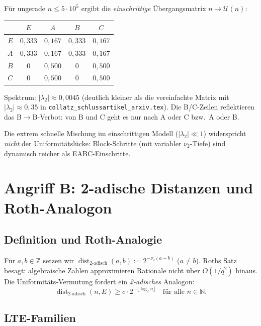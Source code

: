 \documentclass[12pt,a4paper]{article}
\newcommand{\vii}{\nu_2}
\newcommand{\N}{\mathbb{N}}
\newcommand{\Z}{\mathbb{Z}}
\newcommand{\U}{\mathcal{U}}
\newcommand{\disttwo}{\operatorname{dist}_{2\text{-adisch}}}
\begin{document}
Für ungerade $n\leq 5\cdot 10^5$ ergibt die \emph{einschrittige}
Übergangsmatrix $n\mapsto \U(n)$:

\begin{center}
\small
\begin{tabular}{c|cccc}
\toprule
 & $E$ & $A$ & $B$ & $C$ \\
\midrule
$E$ & $0{,}333$ & $0{,}167$ & $0{,}333$ & $0{,}167$ \\
$A$ & $0{,}333$ & $0{,}167$ & $0{,}333$ & $0{,}167$ \\
$B$ & $0$ & $0{,}500$ & $0$ & $0{,}500$ \\
$C$ & $0$ & $0{,}500$ & $0$ & $0{,}500$ \\
\bottomrule
\end{tabular}
\end{center}

Spektrum: $|\lambda_2|\approx 0{,}0045$ (deutlich kleiner als die
vereinfachte Matrix mit $|\lambda_2|\approx 0{,}35$ in
\texttt{collatz\_schlussartikel\_arxiv.tex}).
Die B/C-Zeilen reflektieren das B$\to$B-Verbot: von B und C geht es
nur nach A oder C bzw.\ A oder B.

\begin{tcolorbox}[heuristik]
Die extrem schnelle Mischung im einschrittigen Modell ($|\lambda_2|\ll 1$)
widerspricht \emph{nicht} der Uniformitätslücke: Block-Schritte (mit
variabler $\vii$-Tiefe) sind dynamisch reicher als EABC-Einschritte.
\end{tcolorbox}

\section{Angriff B: 2-adische Distanzen und Roth-Analogon}
\label{sec:angriffB}

\subsection{Definition und Roth-Analogie}

Für $a,b\in\Z$ setzen wir $\disttwo(a,b):=2^{-\vii(a-b)}$ ($a\neq b$).
Roths Satz~\cite{Roth1955} besagt: algebraische Zahlen approximieren
Rationale nicht über $O(1/q^2)$ hinaus. Die Uniformitäts-Vermutung
fordert ein \emph{2-adisches} Analogon:
\[
  \disttwo(n,E) \geq c\cdot 2^{-\lfloor\log_2 n\rfloor}
  \quad\text{für alle }n\in\N.
\]

\subsection{LTE-Familien}
\end{document}
